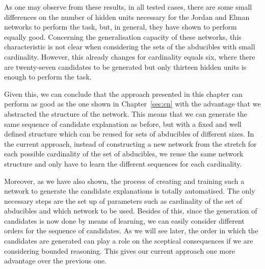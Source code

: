 As one may observe from these results, in all tested cases, there are some small differences on the number of hidden units necessary for the Jordan and Elman networks to perform the task, but, in general, they have shown to perform equally good. Concerning the generalisation capacity of these networks, this characteristic is not clear when considering the sets of the abducibles with small cardinality. However, this already changes for cardinality equals six, where there are twenty-seven candidates to be generated but only thirteen hidden units is enough to perform the task.


Given this, we can conclude that the approach presented in this chapter can perform as good as the one shown in Chapter~\ref{sec:cn} with the advantage that we abstracted the structure of the network. This means that we can generate the same sequence of candidate explanation as before, but with a fixed and well defined structure which can be reused for sets of abducibles of different sizes. In the current approach, instead of constructing a new network from the stretch for each possible cardinality of the set of abducibles, we reuse the same network structure and only have to learn the different sequences for each cardinality.

Moreover, as we have also shown, the process of creating and training such a network to generate the candidate explanations is totally automatised. The only necessary steps are the set up of parameters such as cardinality of the set of abducibles and which network to be used. Besides of this, since the generation of candidates is now done by means of learning, we can easily consider different orders for the sequence of candidates. As we will see later, the order in which the candidates are generated can play a role on the sceptical consequences if we are considering bounded reasoning. This gives our current approach one more advantage over the previous one.
